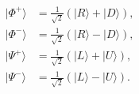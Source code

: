 \begin{align}
  |\Phi^+\rangle &= \frac{1}{\sqrt{2}}(|R\rangle + |D\rangle), \\
  |\Phi^-\rangle &= \frac{1}{\sqrt{2}}(|R\rangle - |D\rangle), \\
  |\Psi^+\rangle &= \frac{1}{\sqrt{2}}(|L\rangle + |U\rangle), \\
  |\Psi^-\rangle &= \frac{1}{\sqrt{2}}(|L\rangle - |U\rangle).
\end{align}

